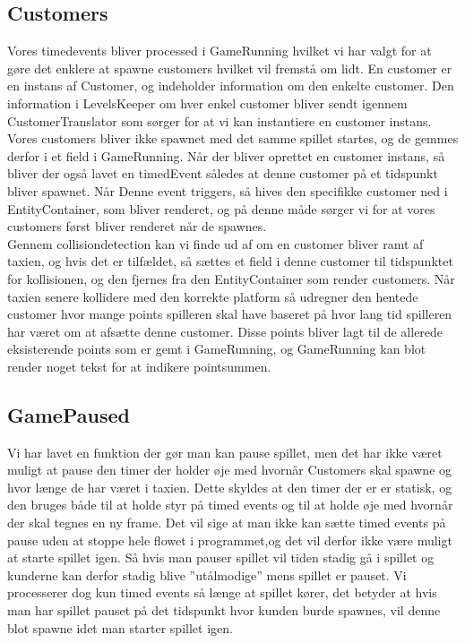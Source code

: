 \subsection{Customers}
   Vores timedevents bliver processed i GameRunning hvilket vi har valgt for at gøre det enklere at spawne customers hvilket vil fremstå om lidt. En customer er en instans af Customer, og indeholder information om den enkelte customer. Den information i LevelsKeeper om hver enkel customer bliver sendt igennem CustomerTranslator som sørger for at vi kan instantiere en customer instans. Vores customers bliver ikke spawnet med det samme spillet startes, og de gemmes derfor i et field i GameRunning. Når der bliver oprettet en customer instans, så bliver der også lavet en timedEvent således at denne customer på et tidspunkt bliver spawnet. Når Denne event triggers, så hives den specifikke customer ned i EntityContainer, som bliver renderet, og på denne måde sørger vi for at vores customers først bliver renderet når de spawnes.\\
   Gennem collisiondetection kan vi finde ud af om en customer bliver ramt af taxien, og hvis det er tilfældet, så sættes et field i denne customer til tidspunktet for kollisionen, og den fjernes fra den EntityContainer som render customers. Når taxien senere kollidere med den korrekte platform så udregner den hentede customer hvor mange points spilleren skal have baseret på hvor lang tid spilleren har været om at afsætte denne customer. Disse points bliver lagt til de allerede eksisterende points som er gemt i GameRunning, og GameRunning kan blot render noget tekst for at indikere pointsummen.\\

\subsection{GamePaused}
   Vi har lavet en funktion der gør man kan pause spillet, men det har ikke været muligt at pause den timer der holder øje med hvornår Customers skal spawne og hvor længe de har været i taxien. Dette skyldes at den timer der er er statisk, og den bruges både til at holde styr på timed events og til at holde øje med hvornår der skal tegnes en ny frame. Det vil sige at man ikke kan sætte timed events på pause uden at stoppe hele flowet i programmet,og det vil derfor ikke være muligt at starte spillet igen. Så hvis man pauser spillet vil tiden stadig gå i spillet og kunderne kan derfor stadig blive ''utålmodige'' mens spillet er pauset. Vi processerer dog kun timed events så længe at spillet kører, det betyder at hvis man har spillet pauset på det tidspunkt hvor kunden burde spawnes, vil denne blot spawne idet man starter spillet igen. 
